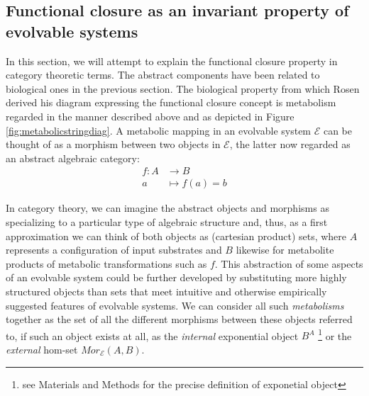 \subsection*{Functional closure as an invariant property of evolvable systems}

In this section, we will attempt to explain the functional closure property in category theoretic terms. The abstract components have been related to biological ones in the previous section. The biological property from which Rosen derived his diagram expressing the functional closure concept is metabolism regarded in the manner described above and as depicted in Figure \ref{fig:metabolicstringdiag}. A metabolic mapping in an evolvable system $\mathcal{E}$ can be thought of as a morphism between two objects in $\mathcal{E}$, the latter now regarded as an abstract algebraic category:
\begin{align*}
f \colon A &\longrightarrow B\\
a &\longmapsto f(a)=b
\end{align*}

In category theory, we can imagine the abstract objects and morphisms as specializing to a particular type of algebraic structure and, thus, as a first approximation we can think of both objects as (cartesian product) sets, where $A$ represents a configuration of input substrates and $B$ likewise for metabolite products of metabolic transformations such as $f$. This abstraction of some aspects of an evolvable system could be further developed by substituting more highly structured objects than sets that meet intuitive and otherwise empirically suggested features of evolvable systems. We can consider all such \emph{metabolisms} together as the set of all the different morphisms between these objects referred to, if such an object exists at all, as the \emph{internal} exponential object $B^A$ \footnote{see Materials and Methods for the precise definition of exponetial object} or the \emph{external} hom-set $Mor_{\mathcal{E}}(A,B)$.

